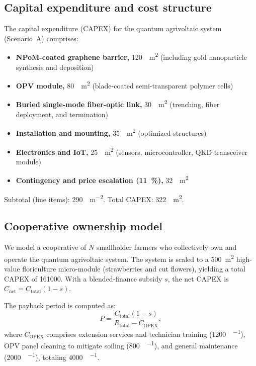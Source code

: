 \documentclass[11pt,a4paper]{article}
\begin{document}
\subsection{Capital expenditure and cost structure}

The capital expenditure (CAPEX) for the quantum agrivoltaic system (Scenario~A) comprises:
\begin{itemize}
\item \textbf{NPoM-coated graphene barrier,} \qty{120}{\per\m\squared} (including gold nanoparticle synthesis and deposition)
\item \textbf{OPV module,} \qty{80}{\per\m\squared} (blade-coated semi-transparent polymer cells)
\item \textbf{Buried single-mode fiber-optic link,} \qty{30}{\per\m\squared} (trenching, fiber deployment, and termination)
\item \textbf{Installation and mounting,} \qty{35}{\per\m\squared} (optimized structures)
\item \textbf{Electronics and IoT,} \qty{25}{\per\m\squared} (sensors, microcontroller, QKD transceiver module)
\item \textbf{Contingency and price escalation (\qty{11}{\percent}),} \qty{32}{\per\m\squared}
\end{itemize}
Subtotal (line items): \qty{290}{\USD\per\m\squared}. Total CAPEX: \qty{322}{\per\m\squared}.

\subsection{Cooperative ownership model}

We model a cooperative of $N$ smallholder farmers who collectively own and operate the quantum agrivoltaic system.
The system is scaled to a \qty{500}{\m\squared} high-value floriculture micro-module (strawberries and cut flowers), yielding a total CAPEX of \qty{161000}{\USD}. With a blended-finance subsidy $s$, the net CAPEX is $C_{\mathrm{net}} = C_{\mathrm{total}}(1 - s)$.

The payback period is computed as:
\begin{equation}\label{eq:SI_payback}
P = \frac{C_{\mathrm{total}} (1 - s)}{R_{\mathrm{total}} - C_{\mathrm{OPEX}}},
\end{equation}
where $C_{\mathrm{OPEX}}$ comprises extension services and technician training (\qty{1200}{\USD\per\yr}), OPV panel cleaning to mitigate soiling (\qty{800}{\USD\per\yr}), and general maintenance (\qty{2000}{\USD\per\yr}), totaling \qty{4000}{\USD\per\yr}.
\end{document}
